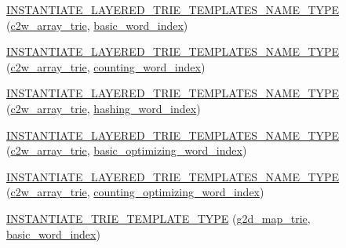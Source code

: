 \begin{DoxyCompactItemize}
\hyperlink{namespaceuva_1_1smt_1_1bpbd_1_1server_1_1lm_af8da2aab9c121b5b788e7f8d484a04b9}{I\+N\+S\+T\+A\+N\+T\+I\+A\+T\+E\+\_\+\+L\+A\+Y\+E\+R\+E\+D\+\_\+\+T\+R\+I\+E\+\_\+\+T\+E\+M\+P\+L\+A\+T\+E\+S\+\_\+\+N\+A\+M\+E\+\_\+\+T\+Y\+P\+E} (\hyperlink{classuva_1_1smt_1_1bpbd_1_1server_1_1lm_1_1c2w__array__trie}{c2w\+\_\+array\+\_\+trie}, \hyperlink{classuva_1_1smt_1_1bpbd_1_1server_1_1lm_1_1dictionary_1_1basic__word__index}{basic\+\_\+word\+\_\+index})
\item 
\hyperlink{namespaceuva_1_1smt_1_1bpbd_1_1server_1_1lm_ab646181483655a936af1717fbebb1169}{I\+N\+S\+T\+A\+N\+T\+I\+A\+T\+E\+\_\+\+L\+A\+Y\+E\+R\+E\+D\+\_\+\+T\+R\+I\+E\+\_\+\+T\+E\+M\+P\+L\+A\+T\+E\+S\+\_\+\+N\+A\+M\+E\+\_\+\+T\+Y\+P\+E} (\hyperlink{classuva_1_1smt_1_1bpbd_1_1server_1_1lm_1_1c2w__array__trie}{c2w\+\_\+array\+\_\+trie}, \hyperlink{classuva_1_1smt_1_1bpbd_1_1server_1_1lm_1_1dictionary_1_1counting__word__index}{counting\+\_\+word\+\_\+index})
\item 
\hyperlink{namespaceuva_1_1smt_1_1bpbd_1_1server_1_1lm_a0d3901ca4b41e6c780461e3a4a73fd51}{I\+N\+S\+T\+A\+N\+T\+I\+A\+T\+E\+\_\+\+L\+A\+Y\+E\+R\+E\+D\+\_\+\+T\+R\+I\+E\+\_\+\+T\+E\+M\+P\+L\+A\+T\+E\+S\+\_\+\+N\+A\+M\+E\+\_\+\+T\+Y\+P\+E} (\hyperlink{classuva_1_1smt_1_1bpbd_1_1server_1_1lm_1_1c2w__array__trie}{c2w\+\_\+array\+\_\+trie}, \hyperlink{classuva_1_1smt_1_1bpbd_1_1server_1_1lm_1_1dictionary_1_1hashing__word__index}{hashing\+\_\+word\+\_\+index})
\item 
\hyperlink{namespaceuva_1_1smt_1_1bpbd_1_1server_1_1lm_a14388b1a778bda6a2831a37fb5fb05f6}{I\+N\+S\+T\+A\+N\+T\+I\+A\+T\+E\+\_\+\+L\+A\+Y\+E\+R\+E\+D\+\_\+\+T\+R\+I\+E\+\_\+\+T\+E\+M\+P\+L\+A\+T\+E\+S\+\_\+\+N\+A\+M\+E\+\_\+\+T\+Y\+P\+E} (\hyperlink{classuva_1_1smt_1_1bpbd_1_1server_1_1lm_1_1c2w__array__trie}{c2w\+\_\+array\+\_\+trie}, \hyperlink{namespaceuva_1_1smt_1_1bpbd_1_1server_1_1lm_1_1dictionary_a3001583c904eec702b4a4125082a7ecd}{basic\+\_\+optimizing\+\_\+word\+\_\+index})
\item 
\hyperlink{namespaceuva_1_1smt_1_1bpbd_1_1server_1_1lm_ada84686a12ed09b176422959abd36d5c}{I\+N\+S\+T\+A\+N\+T\+I\+A\+T\+E\+\_\+\+L\+A\+Y\+E\+R\+E\+D\+\_\+\+T\+R\+I\+E\+\_\+\+T\+E\+M\+P\+L\+A\+T\+E\+S\+\_\+\+N\+A\+M\+E\+\_\+\+T\+Y\+P\+E} (\hyperlink{classuva_1_1smt_1_1bpbd_1_1server_1_1lm_1_1c2w__array__trie}{c2w\+\_\+array\+\_\+trie}, \hyperlink{namespaceuva_1_1smt_1_1bpbd_1_1server_1_1lm_1_1dictionary_a61cbd647b15de785ccf4cdd26661c366}{counting\+\_\+optimizing\+\_\+word\+\_\+index})
\item 
\hyperlink{namespaceuva_1_1smt_1_1bpbd_1_1server_1_1lm_af18bffe5fe4ddc882de6a293310850d0}{I\+N\+S\+T\+A\+N\+T\+I\+A\+T\+E\+\_\+\+T\+R\+I\+E\+\_\+\+T\+E\+M\+P\+L\+A\+T\+E\+\_\+\+T\+Y\+P\+E} (\hyperlink{classuva_1_1smt_1_1bpbd_1_1server_1_1lm_1_1g2d__map__trie}{g2d\+\_\+map\+\_\+trie}, \hyperlink{classuva_1_1smt_1_1bpbd_1_1server_1_1lm_1_1dictionary_1_1basic__word__index}{basic\+\_\+word\+\_\+index})

\end{DoxyCompactItemize}
